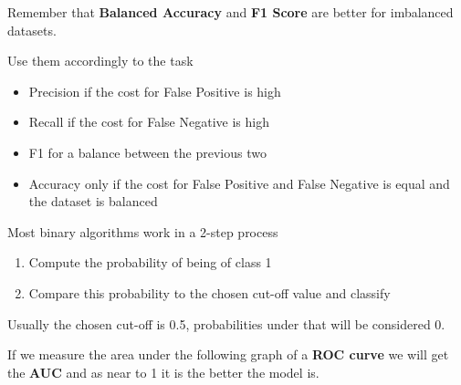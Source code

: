 \vspace{10pt}


Remember that \textbf{Balanced Accuracy} and \textbf{F1 Score} are better for imbalanced datasets.

\vspace{10pt}

Use them accordingly to the task

\begin{itemize}
    \item Precision if the cost for False Positive is high
    \item Recall if the cost for False Negative is high
    \item F1 for a balance between the previous two
    \item Accuracy only if the cost for False Positive and False Negative is equal and the dataset is balanced
\end{itemize}

\vspace{20pt}

Most binary algorithms work in a 2-step process
\begin{enumerate}
    \item Compute the probability of being of class 1
    \item Compare this probability to the chosen cut-off value and classify
\end{enumerate}

Usually the chosen cut-off is 0.5, probabilities under that will be considered 0. 

If we measure the area under the following graph of a \textbf{ROC curve} we will get the \textbf{AUC} and as near to 1 it is the better the model is. 



